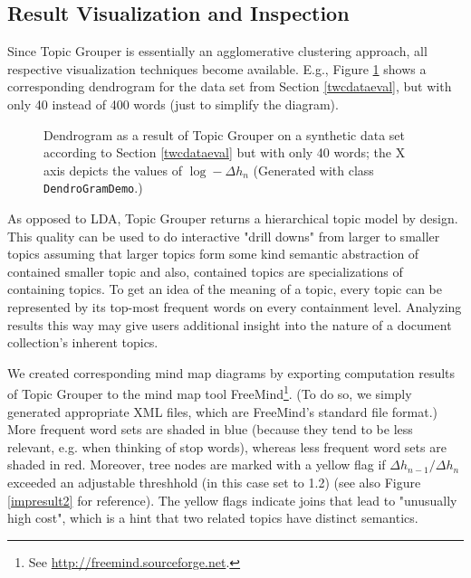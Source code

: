 \documentclass[10pt, a4paper, oneside]{article}
\begin{document}
\subsection{Result Visualization and Inspection}

Since Topic Grouper is essentially an agglomerative clustering approach, all respective visualization techniques become available.
E.g., Figure \ref{dendrogram} shows a corresponding dendrogram for the data set from Section \ref{twcdataeval}, but with only 40 instead of 400 words (just to simplify the diagram).
 
\begin{figure}
\caption{Dendrogram as a result of Topic Grouper on a synthetic data set according to Section \ref{twcdataeval} but with only 40 words; the X axis  depicts the values of $\log - \Delta h_{n}$ (Generated with class \texttt{DendroGramDemo}.)}
\label{dendrogram}
\end{figure}

As opposed to LDA, Topic Grouper returns a hierarchical topic model by design.
This quality can be used to do interactive "drill downs" from larger to smaller topics assuming that larger topics form some kind semantic abstraction of contained smaller topic and also, contained topics are specializations of containing topics. To get an idea of the meaning of a topic, every topic can be represented by its top-most frequent words on every containment level.
Analyzing results this way may give users additional insight into the nature of a document collection's inherent topics.

We created corresponding mind map diagrams by exporting computation results of Topic Grouper to the mind map tool FreeMind\footnote{See
\href{http://freemind.sourceforge.net}{http://freemind.sourceforge.net}.}. (To do so, we simply generated appropriate XML files, which are FreeMind's standard file format.) More frequent word sets are shaded in blue (because they tend to be less relevant, e.g. when thinking of stop words), whereas less frequent word sets are shaded in red. Moreover, tree nodes are marked with a yellow flag if 
$\Delta h_{n-1} / \Delta h_{n}$ exceeded an adjustable threshhold (in this case set to 1.2) (see also Figure \ref{impresult2} for reference).
The yellow flags indicate joins that lead to "unusually high cost", which is a hint that two related topics have distinct semantics.
\end{document}
